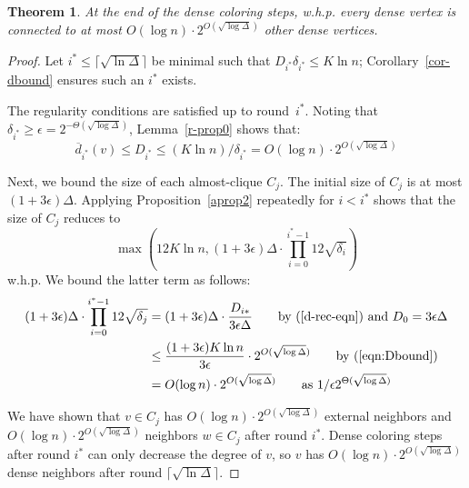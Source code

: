 \documentclass[11pt]{amsart}
\newtheorem{theorem}{Theorem}[section]
\newcommand{\extd}{\ensuremath{{\overline{d}}}}
\begin{document}
\begin{theorem}
\label{th1}
At the end of the dense coloring steps, w.h.p. every dense vertex is connected to at most $O(\log n)\cdot 2^{O(\sqrt{\log \Delta})}$ other dense vertices.
\end{theorem}
\begin{proof}
Let $i^* \leq \lceil \sqrt{\ln \Delta} \rceil$ be minimal such that $D_{i^*} \delta_{i^*} \leq K \ln n$; Corollary~\ref{cor-dbound} ensures such an $i^*$ exists. 

The regularity conditions are satisfied up to round~$i^*$. Noting that $\delta_{i^*} \geq \epsilon = 2^{-\Theta(\sqrt{\log \Delta})}$, Lemma~\ref{r-prop0} shows that:
\begin{equation}\label{eqn:Dbound}
\extd_{i^*}(v) \leq D_{i^*} \leq (K \ln n)/\delta_{i^{*}} = O( \log n ) \cdot 2^{O(\sqrt{\log \Delta})}
\end{equation}

Next, we bound the size of each almost-clique $C_j$. The initial size of $C_j$ is at most $(1+3 \epsilon) \Delta$. Applying Proposition~\ref{aprop2} repeatedly for $i < i^*$ shows that the size of $C_j$ reduces to 
$$
\max(12 K\ln n, (1+3\epsilon) \Delta \cdot \prod_{i=0}^{i^*-1} 12 \sqrt{\delta_i})
$$
w.h.p. We bound the latter term as follows:
{\allowdisplaybreaks
\begin{align*}
(1+3\epsilon) \Delta \cdot \prod_{i=0}^{i^*-1} 12 \sqrt{\delta_j} &= (1+3\epsilon) \Delta \cdot \frac{ D_{i*}}{3 \epsilon \Delta} \qquad \text{by (\ref{d-rec-eqn}) and $D_0 = 3\epsilon\Delta$} \\
 &\leq \frac{(1+3\epsilon)K \ln n}{3 \epsilon} \cdot 2^{O(\sqrt{\log \Delta})} \qquad \text{by (\ref{eqn:Dbound})} \\
&= O(\log n) \cdot 2^{O(\sqrt{\log \Delta})} \qquad \text{as $1/\epsilon  2^{\Theta(\sqrt{\log \Delta})}$}
\end{align*}
}

We have shown that  $v \in C_j$ has $O(\log n)\cdot 2^{O(\sqrt{\log \Delta})}$ external neighbors and  $O(\log n)\cdot 2^{O(\sqrt{\log \Delta})}$ neighbors $w \in C_j$ after round $i^*$. Dense coloring steps after round $i^*$ can only decrease the degree of $v$, so $v$ has $O(\log n)\cdot 2^{O(\sqrt{\log \Delta})}$ dense neighbors after round $\lceil \sqrt{\ln \Delta} \rceil$. 
\end{proof}
\end{document}

